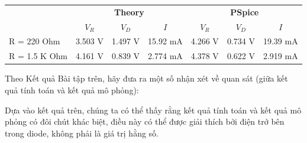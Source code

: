\begin{table}[h]
    \centering
    \begin{tabular}{@{}lcccccc@{}}
        \toprule
        & \multicolumn{3}{c}{\textbf{Theory}} & \multicolumn{3}{c}{\textbf{PSpice}} \\
        \cmidrule(rl{0.5cm}){2-4} \cmidrule(rl{0.5cm}){5-7}
        & \textbf{$V_R$} & \textbf{$V_D$} & \textbf{$I$} & \textbf{$V_R$} & \textbf{$V_D$} & \textbf{$I$} \\
        \midrule
        R = 220 Ohm  & 3.503 V & 1.497 V & 15.92 mA & 4.266 V & 0.734 V & 19.39 mA \\ 
        R = 1.5 K Ohm & 4.161 V & 0.839 V & 2.774 mA & 4.378 V & 0.622 V & 2.919 mA \\ 
        \bottomrule
    \end{tabular}
\end{table}

Theo Kết quả Bài tập trên, hãy đưa ra một số nhận xét về quan sát (giữa kết quả tính toán và kết quả mô phỏng):

Dựa vào kết quả trên, chúng ta có thể thấy rằng kết quả tính toán và kết quả mô phỏng có đôi chút khác biệt, điều này có thể được giải thích bởi điện trở bên trong diode, không phải là giá trị hằng số.